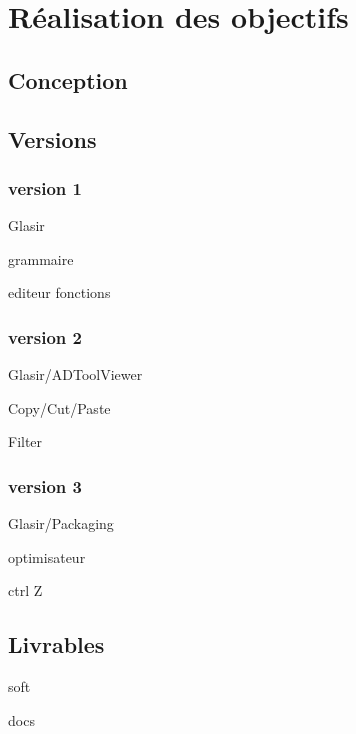 \section{Réalisation des objectifs}
	\subsection{Conception}
	\subsection{Versions}
		\subsubsection{version 1}

			Glasir

			grammaire

			editeur fonctions

		\subsubsection{version 2}

			Glasir/ADToolViewer

			Copy/Cut/Paste

			Filter

		\subsubsection{version 3}

			Glasir/Packaging

			optimisateur

			ctrl Z

	\subsection{Livrables}

			soft

			docs
